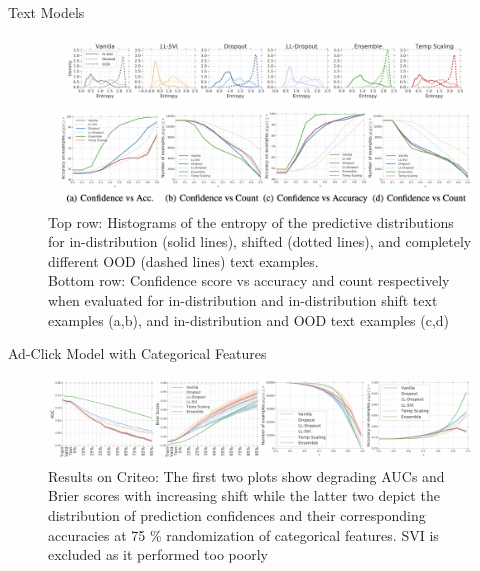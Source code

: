 \documentclass{beamer}
\begin{document}
\begin{frame}{Text Models}
    \begin{figure}{}
        \centering
        \includegraphics[scale=0.42]{images/figure4.png}
        \caption{Top row: Histograms of the entropy of the predictive distributions for in-distribution (solid lines), shifted (dotted lines), and completely different OOD (dashed lines) text examples. \\ Bottom row: Confidence score vs accuracy and count respectively when evaluated for in-distribution and
        in-distribution shift text examples (a,b), and in-distribution and OOD text examples (c,d)}
        \label{fig:enter-label}
    \end{figure}
\end{frame}


\begin{frame}{Ad-Click Model with Categorical Features}
    \begin{figure}{}
        \centering
        \includegraphics[scale=0.45]{images/figure5.png}
        \caption{Results on Criteo: The first two plots show degrading AUCs and Brier scores with increasing shift while the latter two depict the distribution of prediction confidences and their corresponding accuracies at 75 \% randomization of categorical features. SVI is excluded as it performed too poorly}
        \label{fig:enter-label}
    \end{figure}
\end{frame}
\end{document}
